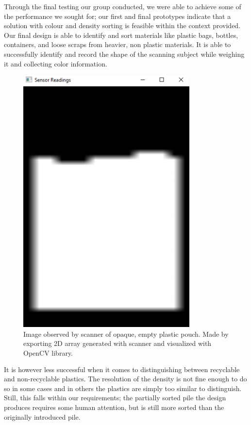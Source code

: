 \documentclass[12pt]{article}
\begin{document}
\begin{multicols*}{2}
            Through the final testing our group conducted, we were able to achieve some of the performance we sought for; our first and final prototypes indicate that a solution with colour and density sorting is feasible within the context provided. Our final design is able to identify and sort materials like plastic bags, bottles, containers, and loose scraps from heavier, non plastic materials. It is able to successfully identify and record the shape of the scanning subject while weighing it and collecting color information. 
            
            \begin{figure}[H]
                \centering\includegraphics[width=0.5\linewidth]{ScannedImage.png}
                \captionsetup{width=\linewidth}
                \caption{Image observed by scanner of opaque, empty plastic pouch. Made by exporting 2D array generated with scanner and visualized with OpenCV library.}
                \label{fig:ScannedImage}
            \end{figure}

            It is however less successful when it comes to distinguishing between recyclable and non-recyclable plastics. The resolution of the density is not fine enough to do so in some cases and in others the plastics are simply too similar to distinguish. Still, this falls within our requirements; the partially sorted pile the design produces requires some human attention, but is still more sorted than the originally introduced pile. 


\end{multicols*}
\end{document}
